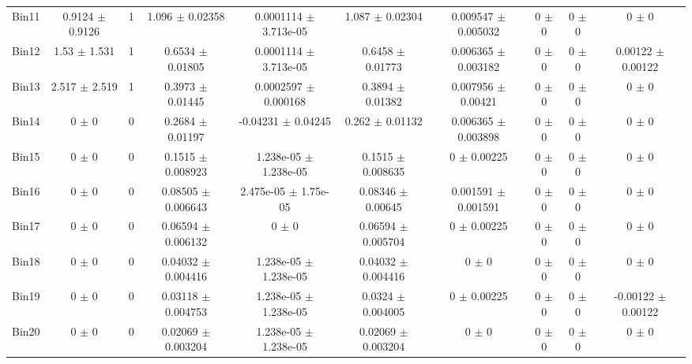 \begin{tabular}{@{\extracolsep{4pt}}lccccccccc@{}}
     Bin11 & 0.9124 $\pm$ 0.9126 & 1 & 1.096 $\pm$ 0.02358 & 0.0001114 $\pm$ 3.713e-05 & 1.087 $\pm$ 0.02304 & 0.009547 $\pm$ 0.005032 & 0 $\pm$ 0 & 0 $\pm$ 0 & 0 $\pm$ 0 \\ 
     Bin12 & 1.53 $\pm$ 1.531 & 1 & 0.6534 $\pm$ 0.01805 & 0.0001114 $\pm$ 3.713e-05 & 0.6458 $\pm$ 0.01773 & 0.006365 $\pm$ 0.003182 & 0 $\pm$ 0 & 0 $\pm$ 0 & 0.00122 $\pm$ 0.00122 \\ 
     Bin13 & 2.517 $\pm$ 2.519 & 1 & 0.3973 $\pm$ 0.01445 & 0.0002597 $\pm$ 0.000168 & 0.3894 $\pm$ 0.01382 & 0.007956 $\pm$ 0.00421 & 0 $\pm$ 0 & 0 $\pm$ 0 & 0 $\pm$ 0 \\ 
     Bin14 & 0 $\pm$ 0 & 0 & 0.2684 $\pm$ 0.01197 & -0.04231 $\pm$ 0.04245 & 0.262 $\pm$ 0.01132 & 0.006365 $\pm$ 0.003898 & 0 $\pm$ 0 & 0 $\pm$ 0 & 0 $\pm$ 0 \\ 
     Bin15 & 0 $\pm$ 0 & 0 & 0.1515 $\pm$ 0.008923 & 1.238e-05 $\pm$ 1.238e-05 & 0.1515 $\pm$ 0.008635 & 0 $\pm$ 0.00225 & 0 $\pm$ 0 & 0 $\pm$ 0 & 0 $\pm$ 0 \\ 
     Bin16 & 0 $\pm$ 0 & 0 & 0.08505 $\pm$ 0.006643 & 2.475e-05 $\pm$ 1.75e-05 & 0.08346 $\pm$ 0.00645 & 0.001591 $\pm$ 0.001591 & 0 $\pm$ 0 & 0 $\pm$ 0 & 0 $\pm$ 0 \\ 
     Bin17 & 0 $\pm$ 0 & 0 & 0.06594 $\pm$ 0.006132 & 0 $\pm$ 0 & 0.06594 $\pm$ 0.005704 & 0 $\pm$ 0.00225 & 0 $\pm$ 0 & 0 $\pm$ 0 & 0 $\pm$ 0 \\ 
     Bin18 & 0 $\pm$ 0 & 0 & 0.04032 $\pm$ 0.004416 & 1.238e-05 $\pm$ 1.238e-05 & 0.04032 $\pm$ 0.004416 & 0 $\pm$ 0 & 0 $\pm$ 0 & 0 $\pm$ 0 & 0 $\pm$ 0 \\ 
     Bin19 & 0 $\pm$ 0 & 0 & 0.03118 $\pm$ 0.004753 & 1.238e-05 $\pm$ 1.238e-05 & 0.0324 $\pm$ 0.004005 & 0 $\pm$ 0.00225 & 0 $\pm$ 0 & 0 $\pm$ 0 & -0.00122 $\pm$ 0.00122 \\ 
     Bin20 & 0 $\pm$ 0 & 0 & 0.02069 $\pm$ 0.003204 & 1.238e-05 $\pm$ 1.238e-05 & 0.02069 $\pm$ 0.003204 & 0 $\pm$ 0 & 0 $\pm$ 0 & 0 $\pm$ 0 & 0 $\pm$ 0 \\ 
\hline\hline
  \end{tabular}
